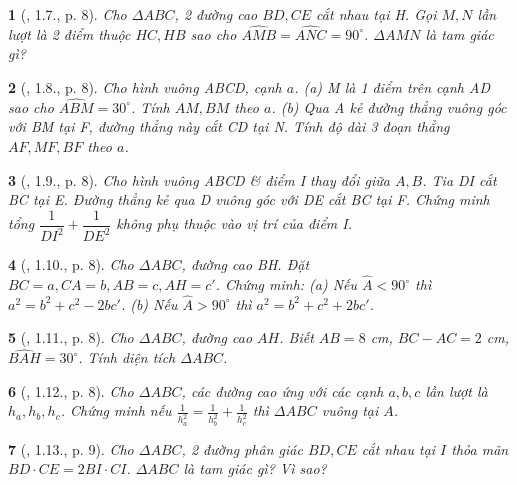 \documentclass{article}
\newtheorem{baitoan}{}
\begin{document}
\begin{baitoan}[\cite{TLCT_THCS_Toan_9_hinh_hoc}, 1.7., p. 8]
	Cho $\Delta ABC$, 2 đường cao $BD,CE$ cắt nhau tại H. Gọi $M,N$ lần lượt là 2 điểm thuộc $HC,HB$ sao cho $\widehat{AMB} = \widehat{ANC} = 90^\circ$. $\Delta AMN$ là tam giác gì?
\end{baitoan}

\begin{baitoan}[\cite{TLCT_THCS_Toan_9_hinh_hoc}, 1.8., p. 8]
	Cho hình vuông ABCD, cạnh $a$. (a) M là 1 điểm trên cạnh AD sao cho $\widehat{ABM} = 30^\circ$. Tính $AM,BM$ theo $a$. (b) Qua A kẻ đường thẳng vuông góc với BM tại F, đường thẳng này cắt CD tại N. Tính độ dài 3 đoạn thẳng $AF,MF,BF$ theo $a$.
\end{baitoan}

\begin{baitoan}[\cite{TLCT_THCS_Toan_9_hinh_hoc}, 1.9., p. 8]
	Cho hình vuông ABCD \& điểm I thay đổi giữa $A,B$. Tia DI cắt BC tại E. Đường thẳng kẻ qua D vuông góc với DE cắt BC tại F. Chứng minh tổng $\dfrac{1}{DI^2} + \dfrac{1}{DE^2}$ không phụ thuộc vào vị trí của điểm I.
\end{baitoan}

\begin{baitoan}[\cite{TLCT_THCS_Toan_9_hinh_hoc}, 1.10., p. 8]
	Cho $\Delta ABC$, đường cao BH. Đặt $BC = a,CA = b,AB = c,AH = c'$. Chứng minh: (a) Nếu $\widehat{A} < 90^\circ$ thì $a^2 = b^2 + c^2 - 2bc'$. (b) Nếu $\widehat{A} > 90^\circ$ thì $a^2 = b^2 + c^2 + 2bc'$.
\end{baitoan}

\begin{baitoan}[\cite{TLCT_THCS_Toan_9_hinh_hoc}, 1.11., p. 8]
	Cho $\Delta ABC$, đường cao $AH$. Biết $AB = 8$ {\rm cm}, $BC - AC = 2$ {\rm cm}, $\widehat{BAH} = 30^\circ$. Tính diện tích $\Delta ABC$.
\end{baitoan}

\begin{baitoan}[\cite{TLCT_THCS_Toan_9_hinh_hoc}, 1.12., p. 8]
	Cho $\Delta ABC$, các đường cao ứng với các cạnh $a,b,c$ lần lượt là $h_a,h_b,h_c$. Chứng minh nếu $\frac{1}{h_a^2} = \frac{1}{h_b^2} + \frac{1}{h_c^2}$ thì $\Delta ABC$ vuông tại $A$.
\end{baitoan}

\begin{baitoan}[\cite{TLCT_THCS_Toan_9_hinh_hoc}, 1.13., p. 9]
	Cho $\Delta ABC$, 2 đường phân giác $BD,CE$ cắt nhau tại $I$ thỏa mãn $BD\cdot CE= 2BI\cdot CI$. $\Delta ABC$ là tam giác gì? Vì sao?
\end{baitoan}
\end{document}
